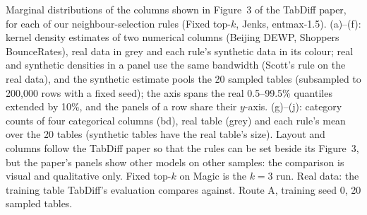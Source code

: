 Marginal distributions of the columns shown in Figure~3 of the TabDiff paper, for each of our neighbour-selection rules (Fixed top-$k$, Jenks, entmax-1.5). (a)--(f): kernel density estimates of two numerical columns (Beijing DEWP, Shoppers BounceRates), real data in grey and each rule's synthetic data in its colour; real and synthetic densities in a panel use the same bandwidth (Scott's rule on the real data), and the synthetic estimate pools the 20 sampled tables (subsampled to 200{,}000 rows with a fixed seed); the axis spans the real 0.5--99.5\% quantiles extended by 10\%, and the panels of a row share their $y$-axis. (g)--(j): category counts of four categorical columns ({bd}), real table (grey) and each rule's mean over the 20 tables (synthetic tables have the real table's size). Layout and columns follow the TabDiff paper so that the rules can be set beside its Figure~3, but the paper's panels show other models on other samples: the comparison is visual and qualitative only. Fixed top-$k$ on Magic is the $k=3$ run. Real data: the training table TabDiff's evaluation compares against. Route A, training seed 0, 20 sampled tables.
